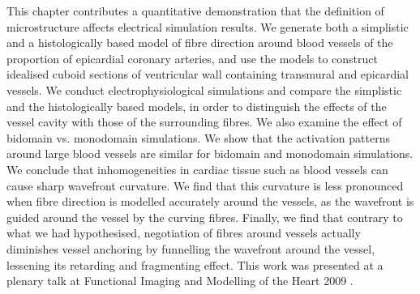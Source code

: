 
This chapter contributes a quantitative demonstration that the definition of microstructure affects electrical simulation results. We generate both a simplistic and a histologically based model of fibre direction around blood vessels of the proportion of epicardial coronary arteries, and use the models to construct idealised cuboid sections of ventricular wall containing transmural and epicardial vessels. We conduct electrophysiological simulations and compare the simplistic and the histologically based models, in order to distinguish the effects of the vessel cavity with those of the surrounding fibres. We also examine the effect of bidomain vs. monodomain simulations. We show that the activation patterns around large blood vessels are similar for bidomain and monodomain simulations. We conclude that inhomogeneities in cardiac tissue such as blood vessels can cause sharp wavefront curvature. We find that this curvature is less pronounced when fibre direction is modelled accurately around the vessels, as the wavefront is guided around the vessel by the curving fibres. Finally, we find that contrary to what we had hypothesised, negotiation of fibres around vessels actually diminishes vessel anchoring by funnelling the wavefront around the vessel, lessening its retarding and fragmenting effect. This work was presented at a plenary talk at Functional Imaging and Modelling of the Heart 2009 \cite{Gibb2009}.

